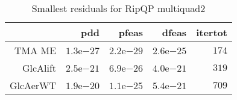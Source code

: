\documentclass[varwidth=20cm,crop=true]{standalone}
\begin{document}
\begin{table}
  \caption{Smallest residuals for RipQP multiquad2}
  \begin{tabular}{rrrrr}
    \hline\hline
     & \textbf{pdd} & \textbf{pfeas} & \textbf{dfeas} & \textbf{itertot} \\\hline
    TMA ME & \(1.3\)e\(-27\) & \(2.2\)e\(-29\) & \(2.6\)e\(-25\) & \(174\) \\
    GlcAlift & \(2.5\)e\(-21\) & \(6.9\)e\(-26\) & \(4.0\)e\(-21\) & \(319\) \\
    GlcAerWT & \(1.9\)e\(-20\) & \(1.1\)e\(-25\) & \(5.4\)e\(-21\) & \(709\) \\\hline\hline
  \end{tabular}
\end{table}
\end{document}
